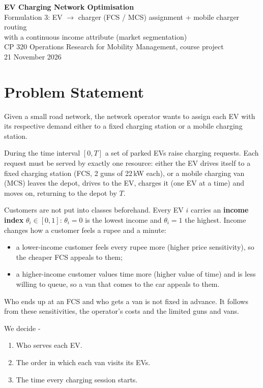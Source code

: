 \documentclass[12pt,a4paper]{article}
\begin{document}
\begin{center}
{\LARGE\bfseries\color{headblue} EV Charging Network Optimisation}\\[6pt]
{\large Formulation 3: EV $\rightarrow$ charger (FCS / MCS) assignment + mobile charger routing\\ with a continuous income attribute (market segmentation)}\\[4pt]
{\normalsize CP 320 Operations Research for Mobility Management, course project}\\[2pt]
{\normalsize 21 November 2026}
\end{center}
\vspace{4pt}

\section{Problem Statement}

Given a small road network, the network operator wants to assign each EV with its respective demand either to a fixed charging station or a mobile charging station.

\hspace{1.5em}During the time interval $[0,T]$ a set of parked EVs raise charging requests. Each request must be served by exactly one resource: either the EV drives itself to a fixed charging station (FCS, 2 guns of 22\,kW each), or a mobile charging van (MCS) leaves the depot, drives to the EV, charges it (one EV at a time) and moves on, returning to the depot by $T$.

Customers are not put into classes beforehand. Every EV $i$ carries an \textbf{income index} $\theta_i\in[0,1]$: $\theta_i=0$ is the lowest income and $\theta_i=1$ the highest. Income changes how a customer feels a rupee and a minute:
\begin{itemize}[itemsep=1pt]
  \item a lower-income customer feels every rupee more (higher price sensitivity), so the cheaper FCS appeals to them;
  \item a higher-income customer values time more (higher value of time) and is less willing to queue, so a van that comes to the car appeals to them.
\end{itemize}
Who ends up at an FCS and who gets a van is not fixed in advance. It follows from these sensitivities, the operator's costs and the limited guns and vans.

We decide -
\begin{enumerate}[itemsep=2pt]
  \item Who serves each EV.
  \item The order in which each van visits its EVs.
  \item The time every charging session starts.
\end{enumerate}
\end{document}
